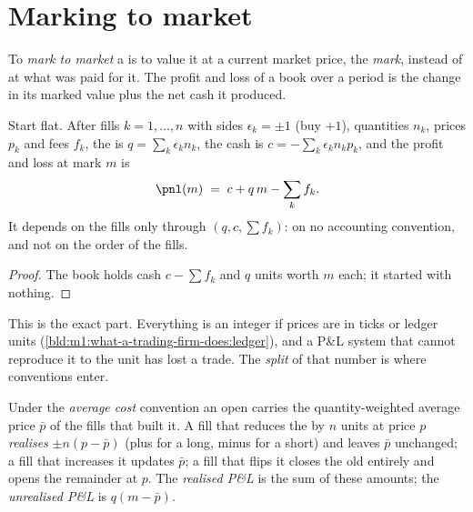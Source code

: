 \section{Marking to market}

\begin{definition}\label{def:m1:pnl-and-positions:mtm}
To \emph{mark to market} a  is to value it at a
current market price, the \emph{mark}, instead of at what was paid for it.
The profit and loss of a book over a period is the change in its marked value
plus the net cash it produced.
\end{definition}

\begin{proposition}\label{prop:m1:pnl-and-positions:identity}
Start flat. After fills $k = 1,\dots,n$ with sides $\epsilon_k = \pm1$ (buy
$+1$), quantities $n_k$, prices $p_k$ and fees $f_k$, the  is $q =
\sum_k \epsilon_k n_k$, the cash is $c = -\sum_k \epsilon_k n_k p_k$, and the
profit and loss at mark $m$ is
\[
\pnl(m) \;=\; c + q\,m - \sum_k f_k .
\]
It depends on the fills only through $(q, c, \sum f_k)$: on no accounting
convention, and not on the order of the fills.
\end{proposition}
\begin{proof}
The book holds cash $c - \sum f_k$ and $q$ units worth $m$ each; it started
with nothing.
\end{proof}

This is the exact part. Everything is an integer if prices are in ticks or
ledger units (\cref{bld:m1:what-a-trading-firm-does:ledger}), and a P\&L
system that cannot reproduce it to the unit has lost a trade. The
\emph{split} of that number is where conventions enter.

\begin{definition}\label{def:m1:pnl-and-positions:realised}
Under the \emph{average cost} convention an open 
carries the quantity-weighted average price $\bar p$ of the fills that built
it. A fill that reduces the  by $n$ units at price $p$
\emph{realises} $\pm n(p - \bar p)$ (plus for a long, minus for a short) and
leaves $\bar p$ unchanged; a fill that increases it updates $\bar p$; a fill
that flips it closes the old  entirely and opens the remainder at
$p$. The \emph{realised P\&L} is the sum of these
amounts; the \emph{unrealised P\&L} is $q(m - \bar
p)$.
\end{definition}

